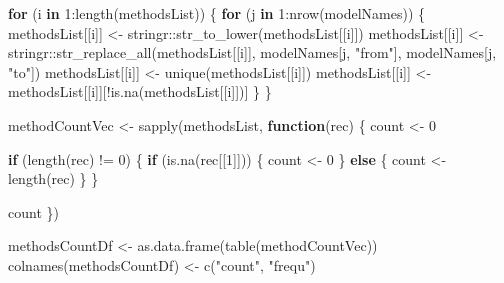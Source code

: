 \documentclass[
]{article}
\newenvironment{Shaded}{\begin{snugshade}}{\end{snugshade}}
\newcommand{\ControlFlowTok}[1]{\textcolor[rgb]{0.13,0.29,0.53}{\textbf{#1}}}
\newcommand{\DecValTok}[1]{\textcolor[rgb]{0.00,0.00,0.81}{#1}}
\newcommand{\FunctionTok}[1]{\textcolor[rgb]{0.00,0.00,0.00}{#1}}
\newcommand{\NormalTok}[1]{#1}
\newcommand{\OtherTok}[1]{\textcolor[rgb]{0.56,0.35,0.01}{#1}}
\newcommand{\SpecialCharTok}[1]{\textcolor[rgb]{0.00,0.00,0.00}{#1}}
\newcommand{\StringTok}[1]{\textcolor[rgb]{0.31,0.60,0.02}{#1}}
\begin{document}
\begin{Shaded}
\begin{Highlighting}[]
\ControlFlowTok{for}\NormalTok{ (i }\ControlFlowTok{in} \DecValTok{1}\SpecialCharTok{:}\FunctionTok{length}\NormalTok{(methodsList)) \{}
  \ControlFlowTok{for}\NormalTok{ (j }\ControlFlowTok{in} \DecValTok{1}\SpecialCharTok{:}\FunctionTok{nrow}\NormalTok{(modelNames)) \{}
\NormalTok{    methodsList[[i]] }\OtherTok{\textless{}{-}}\NormalTok{ stringr}\SpecialCharTok{::}\FunctionTok{str\_to\_lower}\NormalTok{(methodsList[[i]])}
\NormalTok{    methodsList[[i]] }\OtherTok{\textless{}{-}}\NormalTok{ stringr}\SpecialCharTok{::}\FunctionTok{str\_replace\_all}\NormalTok{(methodsList[[i]], modelNames[j, }\StringTok{"from"}\NormalTok{], modelNames[j, }\StringTok{"to"}\NormalTok{])}
\NormalTok{    methodsList[[i]]  }\OtherTok{\textless{}{-}} \FunctionTok{unique}\NormalTok{(methodsList[[i]])}
\NormalTok{    methodsList[[i]] }\OtherTok{\textless{}{-}}\NormalTok{ methodsList[[i]][}\SpecialCharTok{!}\FunctionTok{is.na}\NormalTok{(methodsList[[i]])]}
\NormalTok{  \}  }
\NormalTok{\}}

\NormalTok{methodCountVec }\OtherTok{\textless{}{-}} \FunctionTok{sapply}\NormalTok{(methodsList, }\ControlFlowTok{function}\NormalTok{(rec) \{}
\NormalTok{  count }\OtherTok{\textless{}{-}} \DecValTok{0}
  
  \ControlFlowTok{if}\NormalTok{ (}\FunctionTok{length}\NormalTok{(rec) }\SpecialCharTok{!=} \DecValTok{0}\NormalTok{) \{}
    \ControlFlowTok{if}\NormalTok{ (}\FunctionTok{is.na}\NormalTok{(rec[[}\DecValTok{1}\NormalTok{]])) \{}
\NormalTok{      count }\OtherTok{\textless{}{-}} \DecValTok{0}
\NormalTok{    \} }\ControlFlowTok{else}\NormalTok{ \{}
\NormalTok{      count }\OtherTok{\textless{}{-}} \FunctionTok{length}\NormalTok{(rec)}
\NormalTok{    \}}
\NormalTok{  \}}
  
\NormalTok{  count}
\NormalTok{\})}

\NormalTok{methodsCountDf }\OtherTok{\textless{}{-}} \FunctionTok{as.data.frame}\NormalTok{(}\FunctionTok{table}\NormalTok{(methodCountVec))}
\FunctionTok{colnames}\NormalTok{(methodsCountDf) }\OtherTok{\textless{}{-}} \FunctionTok{c}\NormalTok{(}\StringTok{"count"}\NormalTok{, }\StringTok{"frequ"}\NormalTok{)}


\end{Highlighting}
\end{Shaded}
\end{document}
